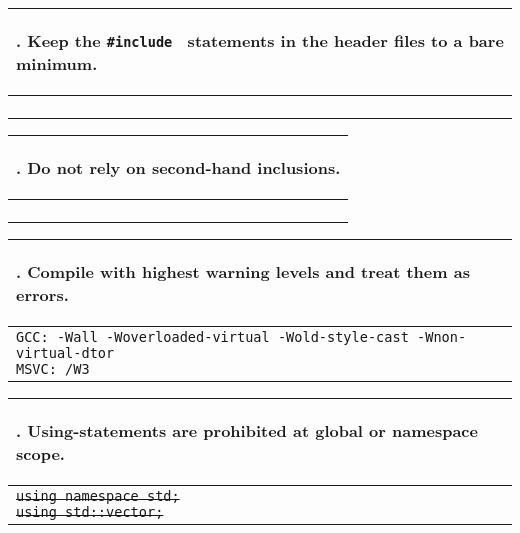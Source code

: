 \documentclass[10pt]{article}
\newcommand{\code}[1]{\color[rgb]{0.2,0.8,0.2}\texttt{#1}\color[rgb]{0,0,0} }
\newcounter {iCommandment}
\newcommand{\CorG}[5]
{
\begin{table}[H]
\begin{center}
\begin{tabular}{| p{12cm} |}
\hline
#1. #2 \\
\hline
\vspace{-0.1cm}
\parbox{12cm}{\code{#3}} \\
\vspace{-0.2cm}
#4 \\
#5 \\
\hline
\end{tabular}
\end{center}
\end{table}
}
\newcommand{\Commandment}[4]
{
\CorG{\textbf{\arabic{iCommandment}}\addtocounter{iCommandment}{1}}
{\textbf{#1}}{#2}{#3}{#4}
}
\begin{document}
\Commandment
{Keep the \code{\#include}\ statements in the header files to a bare minimum.}
{\ }
{Only \#include, in a header file, the bare minimum number of header-files that you need in order to 
complete the declarations of the classes or functions in it, nothing more. Then, \#include, in the source files, 
the other headers that you need to complete the definitions of the classes and functions. Forward-declarations 
can also be used if it is enough to complete the declarations in a header-file, but it is not required to make 
this additional effort to minimize header-file dependencies. The main motivation for this guideline is to minimize 
the dependency between header-files, which reduces compilation time, maintenance cost, and also promotes software 
design that also has fewer interdependencies.}
{\ }

\Commandment
{Do not rely on second-hand inclusions.}
{\ }
{This is not to contradict the previous commandment. Including a bare minimum of headers in a header file 
does not imply that you should rely on second-hand inclusions, that is, include one header and expect that 
that header also includes another one that you need. It is tempting to do so because it seems reasonable, 
but you should not. Include all the headers you need to complete your declarations (no more, no less) and 
don't rely on the assumption that some of the headers included certainly include this other header that you 
need. In other words, your header files should be self-sufficient (not making assumption about what is in
other header files). One exception to this rule is, of course, the case where the particular header included 
is meant to include a few other headers (i.e. it is specified that it does so).}
{\ }

\Commandment
{Compile with highest warning levels and treat them as errors.}
{GCC: -Wall -Woverloaded-virtual -Wold-style-cast -Wnon-virtual-dtor\\ MSVC: /W3}
{By default, the ReaK library build is setup to compile with the highest possible warning level on 
whatever compiler is used. If you see warnings originating from ReaK library code, treat them as 
errors. If it is in your code, fix them. If not, report them. Most warning messages are there for a 
good reason, and they often hide a coding mistake, typo, or design flaw, in any case, they should be 
address with the same rigor as compilation errors.}
{\ }

\Commandment
{Using-statements are prohibited at global or namespace scope.}
{\sout{using namespace std;}\\ \sout{using std::vector;} }
{This prevents name collisions from occurring. It is very important not to pollute the ReaK namespace 
or any of its sub-namespaces or the global scope by importing symboles for an alien namespace with a 
using-statement. The only place where using-statements are acceptable is in a function scope, that is, 
within the function body, because the names imported will be limited to the function scope. Nonetheless,
even in a function body, it is mandatory to only use statements of the form \code{using std::vector;}\ and 
not a using-namespace-statement.}
{\ }
\end{document}
